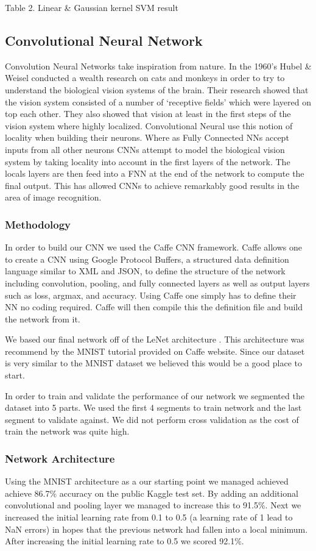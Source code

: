 \documentclass[10pt,twocolumn]{article}
\begin{document}
Table 2. Linear \& Gaussian kernel SVM result
\\

\subsection{Convolutional Neural Network}
Convolution Neural Networks take inspiration from nature. In the 1960's Hubel \& Weisel conducted a wealth research on cats and monkeys in order to try to understand the biological vision systems of the brain. Their research showed that the vision system consisted of a number of `receptive fields' which were layered on top each other. They also showed that vision at least in the first steps of the vision system where highly localized. Convolutional Neural use this notion of locality when building their neurons. Where as Fully Connected NNs accept inputs from all other neurons CNNs attempt to model the biological vision system by taking locality into account in the first layers of the network. The locals layers are then feed into a FNN at the end of the network to compute the final output. This has allowed CNNs to achieve remarkably good results in the area of image recognition. 
\subsubsection{Methodology}
In order to build our CNN we used the Caffe CNN framework\cite{jia2014caffe}. Caffe allows one to create a CNN using Google Protocol Buffers, a structured data definition language similar to XML and JSON, to define the structure of the network including convolution, pooling, and fully connected layers as well as output layers such as loss, argmax, and accuracy. Using Caffe one simply has to define their NN no coding required. Caffe will then compile this the definition file and build the network from it.

We based our final network off of the LeNet architecture \cite{leCunnGradient}. This architecture was recommend by the MNIST tutorial provided on Caffe website. Since our dataset is very similar to the MNIST dataset we believed this would be a good place to start. 

In order to train and validate the performance of our network we segmented the dataset into 5 parts. We used the first 4 segments to train network and the last segment to validate against. We did not perform cross validation as the cost of train the network was quite high. 
\subsubsection{Network Architecture}
Using the MNIST architecture as a our starting point we managed achieved achieve 86.7\% accuracy on the public Kaggle test set. By adding an additional convolutional and pooling layer we managed to increase this to 91.5\%. Next we increased the initial learning rate from 0.1 to 0.5 (a learning rate of 1 lead to NaN errors) in hopes that the previous network had fallen into a local minimum. After increasing the initial learning rate to 0.5 we scored 92.1\%. 
\end{document}

